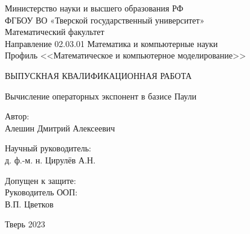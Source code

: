 \documentclass[a4paper]{report}
\begin{document}
\begin{titlepage}
    \begin{center}
        Министерство науки и высшего образования РФ\\
        ФГБОУ ВО «Тверской государственный университет»\\
        Математический факультет\\
        Направление 02.03.01 Математика и компьютерные науки\\
        Профиль <<Математическое и компьютерное моделирование>>
    \end{center}

    \vspace{2.5cm}
    \begin{center}

        {ВЫПУСКНАЯ КВАЛИФИКАЦИОННАЯ РАБОТА }


        \vspace{1.0cm}
        \large{Вычисление операторных экспонент в базисе Паули}


        \vspace{1.5cm}
    \end{center}



    \begin{flushright}
        \begin{minipage}{80mm}
            Автор:\\
            Алешин Дмитрий Алексеевич

            \vspace{1.0cm}
            Научный руководитель:\\
            д. ф.-м. н. Цирулёв А.Н.

        \end{minipage}
    \end{flushright}


    \vspace{1.6cm}
    \noindent Допущен к защите:\\
    Руководитель ООП:\\[1cm]
    \underline{\qquad \qquad \qquad \qquad \qquad }
    В.П. Цветков \\
    \vspace{2.3cm}



    \begin{center}
        Тверь 2023
    \end{center}

    \date{}
\end{titlepage}
\end{document}
